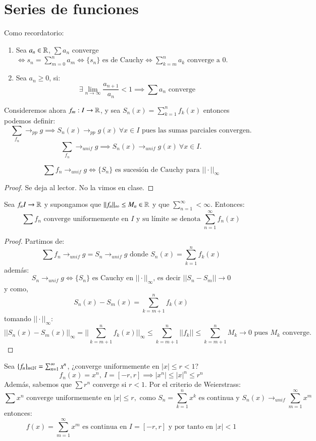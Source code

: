\section{Series de funciones}
Como recordatorio:
\begin{enumerate}
    \item Sea $a_n \in \mathbb{R}$, $\sum a_n$ converge $\iff s_n = \sum_{m=0}^n a_m \iff \{s_n\} \text{ es de Cauchy} \iff \sum_{k=m}^n a_k \text{ converge a } 0$.
    \item Sea $a_n \geq 0$, si:
    $$
        \exists \lim_{n \to \infty} \frac{a_{n+1}}{a_n} < 1 \implies \sum a_n \text{ converge}
    $$
\end{enumerate}
Consideremos ahora $f_m : I \to \mathbb{R}$, y sea $S_n(x) = \sum_{k=1}^n f_k(x)$  entonces podemos definir:
$$
    \sum_{f_n} \to_{pp} g \implies  S_n(x)\to_{pp} g(x)\ \forall x \in I \text{ pues las sumas parciales convergen.}
$$
$$
    \sum_{f_n} \to_{unif} g \implies S_n(x) \to_{unif} g(x)\ \forall x \in I.
$$
\begin{pro}
    $$
        \sum f_n \to_{unif} g \iff \{S_n\} \text{ es sucesión de Cauchy para $||\cdot||_\infty$}
    $$
\end{pro}
\begin{proof}
    Se deja al lector. No la vimos en clase.
\end{proof}
\begin{pro}
    Sea $f_n I \to \mathbb{R}$ y supongamos que $||f_n||_\infty \leq M_n \in \mathbb{R}$  y que $\sum_{n=1}^\infty < \infty$. Entonces:
    $$
        \sum f_n \text{ converge uniformemente en $I$ y su límite se denota } \sum_{n=1}^\infty f_n(x)
    $$
\end{pro}
\begin{proof}
    Partimos de:
    $$
        \sum f_n \to_{unif} g = S_n \to_{unif} g \text{ donde } S_n(x) = \sum_{k=1}^n f_k(x)
    $$
    además:
    $$
        S_n \to_{unif} g \iff \{S_n\} \text{ es Cauchy en $|| \cdot ||_\infty$, es decir } ||S_n - S_m || \to 0
    $$
    y como,
    $$
        S_n(x) - S_m(x) = \sum_{k=m+1}^n f_k(x)
    $$
    tomando $||\cdot||_\infty$:
    $$
        ||S_n(x) - S_m(x)||_\infty = ||\sum_{k=m+1}^n f_k(x)||_\infty \leq \sum_{k=m+1}^{n} ||f_k|| \leq \sum_{k=m+1}^{n} M_k \to 0 \text{ pues $M_k$ converge.}
    $$
\end{proof}
\begin{eg}
    Sea $\{f_n\}_{n\in\mathbb{N}} = \sum_{n=1}^\infty x^n$, ¿converge uniformemente en $|x| \leq r < 1$?\\
    $$
        f_n(x) = x^n,\ I = [-r, r] \implies |x^n| \leq |x|^n \leq r^n
    $$
    Además, sabemos que $\sum r^n$ converge si $r<1$.
    Por el criterio de Weierstrass:
    $$
        \sum x^n \text{ converge uniformemente en } |x| \leq r, \text{ como } S_n=\sum_{k=1}^n x^k \text{ es continua y } S_n(x) \to_{unif} \sum_{m=1}^\infty x^m
    $$
    entonces:
    $$
        f(x) = \sum_{m=1}^{\infty} x^m \text{ es continua en } I = [-r, r] \text{ y por tanto en } |x| < 1
    $$
\end{eg}

